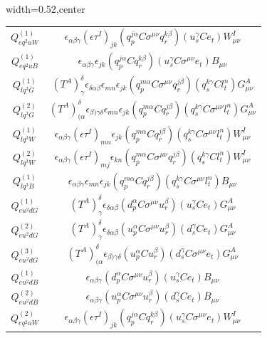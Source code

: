 \begin{table}[H]
\begin{center}
\begin{adjustbox}{width=0.52\textwidth,center}
\begin{minipage}[t]{7.8cm}
\begin{tabular}[t]{c|c}
%
$Q_{eq^2uW}^{(1)}$  &  $\epsilon_{\alpha\beta\gamma} (\epsilon \tau^I)_{jk} (q_p^{j\alpha} C \sigma^{\mu\nu} q_r^{k\beta}) (u_s^{\gamma} C e_t) W^I_{\mu\nu}$ \\
%
$Q_{eq^2uB}^{(1)}$  &  $\epsilon_{\alpha\beta\gamma} \epsilon_{jk} (q_p^{j\alpha} C q_r^{k\beta}) (u_s^{\gamma} C \sigma^{\mu\nu} e_t) B_{\mu\nu}$ \\
%
$Q_{lq^3G}^{(1)}$ & $(T^A)_\gamma^\delta \epsilon_{\delta\alpha\beta}  \epsilon_{mn} \epsilon_{jk} (q_p^{m\alpha} C \sigma^{\mu\nu} q_r^{j\beta}) (q_s^{k\gamma} C l_t^n) G^A_{\mu\nu}$ \\ 
%
$Q_{lq^3G}^{(2)}$ & $(T^A)_{(\alpha}^\delta \epsilon_{\beta)\gamma\delta} \epsilon_{mn} \epsilon_{jk} (q_p^{m\alpha} C q_r^{j\beta}) (q_s^{k\gamma} C \sigma^{\mu\nu} l_t^n) G^A_{\mu\nu}$ \\
%
$Q_{lq^3W}^{(1)}$  &  $\epsilon_{\alpha\beta\gamma} (\epsilon \tau^I)_{mn} \epsilon_{jk} (q_p^{m\alpha} C q_r^{j\beta}) (q_s^{k\gamma} C \sigma^{\mu\nu} l_t^n) W^I_{\mu\nu}$ \\
%
$Q_{lq^3W}^{(2)}$  & $\epsilon_{\alpha\beta\gamma} (\epsilon \tau^I)_{mj} \epsilon_{kn} (q_p^{m\alpha} C \sigma^{\mu\nu}q_r^{j\beta}) (q_s^{k\gamma} C  l_t^n) W^I_{\mu\nu}$  \\
%
$Q_{lq^3B}^{(1)}$ & $\epsilon_{\alpha\beta\gamma} \epsilon_{mn} \epsilon_{jk} (q_p^{m\alpha} C q_r^{j\beta}) (q_s^{k\gamma} C \sigma^{\mu\nu} l_t^n) B_{\mu\nu}$ \\ 
%
$Q_{eu^2dG}^{(1)}$ & $(T^A)_\gamma^\delta \epsilon_{\delta\alpha\beta} (d_p^{\alpha} C \sigma^{\mu\nu} u_r^{\beta}) (u_s^{\gamma} C e_t) G^A_{\mu\nu}$ \\
%
$Q_{eu^2dG}^{(2)}$ & $(T^A)_\gamma^\delta \epsilon_{\delta\alpha\beta} (u_p^{\alpha} C \sigma^{\mu\nu} u_r^{\beta}) (d_s^{\gamma} C e_t) G^A_{\mu\nu}$ \\
%
$Q_{eu^2dG}^{(3)}$ & $(T^A)_{(\alpha}^\delta \epsilon_{\beta)\gamma\delta}  (u_p^{\alpha} C u_r^{\beta}) (d_s^{\gamma} C \sigma^{\mu\nu} e_t) G^A_{\mu\nu}$ \\
%
$Q_{eu^2dB}^{(1)}$ &  $\epsilon_{\alpha\beta\gamma} (d_p^{\alpha} C \sigma^{\mu\nu} u_r^{\beta}) (u_s^{\gamma} C e_t) B_{\mu\nu}$ \\
%
$Q_{eu^2dB}^{(2)}$ & $\epsilon_{\alpha\beta\gamma} (u_p^{\alpha} C \sigma^{\mu\nu} u_r^{\beta}) (d_s^{\gamma} C e_t) B_{\mu\nu}$ \\ \hdashline
%
$Q_{eq^2uW}^{(2)}$  &  $\epsilon_{\alpha\beta\gamma} (\epsilon \tau^I)_{jk} (q_p^{j\alpha} C q_r^{k\beta}) (u_s^{\gamma} C \sigma^{\mu\nu} e_t) W^I_{\mu\nu}$ \\

\end{tabular}
\end{minipage}
\end{adjustbox}
\end{center}
\end{table}
